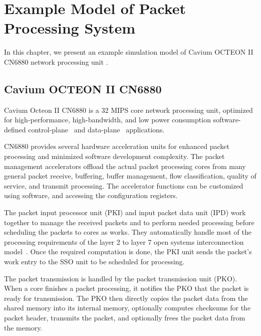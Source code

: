 \chapter{Example Model of Packet Processing System}
\label{chapter:example-simulation-model}

In this chapter, we present an example simulation model of Cavium OCTEON II CN6880 network processing unit \cite{Cavium OCTEON}.


\section{Cavium OCTEON II CN6880}
\label{sec:cavium-octeon}

Cavium Octeon II CN6880 is a 32 MIPS core network processing unit, optimized for high-performance, high-bandwidth, and low power consumption software-defined control-plane~\cite{control-plane} and data-plane~\cite{data-plane} applications.

CN6880 provides several hardware acceleration units for enhanced packet processing and minimized software development complexity. The packet management accelerators offload the actual packet processing cores from many general packet receive, buffering, buffer management, flow classification, quality of service, and transmit processing. The accelerator functions can be customized using software, and accessing the configuration registers.~\cite{Cavium FUNDAMENTALS}

The packet input processor unit (PKI) and input packet data unit (IPD) work together to manage the received packets and to perform needed processing before scheduling the packets to cores as works. They automatically handle most of the processing requirements of the layer 2 to layer 7 open systems interconnection model~\cite{OSI model}. Once the required computation is done, the PKI unit sends the packet's work entry to the SSO unit to be scheduled for processing.~\cite{Cavium FUNDAMENTALS}

The packet transmission is handled by the packet transmission unit (PKO). When a core finishes a packet processing, it notifies the PKO that the packet is ready for transmission. The PKO then directly copies the packet data from the shared memory into its internal memory, optionally computes checksums for the packet header, transmits the packet, and optionally frees the packet data from the memory.~\cite{Cavium FUNDAMENTALS}

